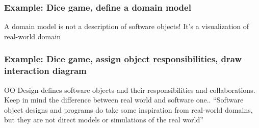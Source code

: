 \documentclass{beamer}
\begin{document}
\begin{frame}
	\frametitle{Example: Dice game, define a domain model}
	A domain model is not a description of software objects! It's a visualization of real-world domain
	\begin{center}
	\end{center}
\end{frame}

\begin{frame}
	\frametitle{Example: Dice game, assign object responsibilities, draw interaction diagram}
	OO Design defines software objects and their responsibilities and collaborations. Keep in mind the 
	difference between real world and software one.. ``Software object designs and programs do take some inspiration from real-world domains, but they are not direct models or simulations of the real world''
	\begin{center}
	\end{center}
\end{frame}
\end{document}
